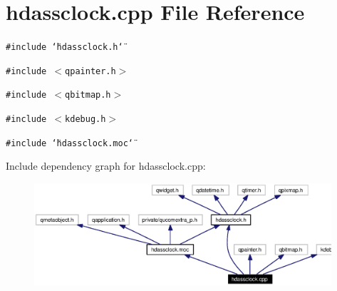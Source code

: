 \section{hdassclock.cpp File Reference}
\label{hdassclock_8cpp}


{\tt \#include \char`\"{}hdassclock.h\char`\"{}}\par
{\tt \#include $<$qpainter.h$>$}\par
{\tt \#include $<$qbitmap.h$>$}\par
{\tt \#include $<$kdebug.h$>$}\par
{\tt \#include \char`\"{}hdassclock.moc\char`\"{}}\par


Include dependency graph for hdassclock.cpp:\begin{figure}[H]
\begin{center}
\leavevmode
\includegraphics[width=313pt]{hdassclock_8cpp__incl}
\end{center}
\end{figure}
